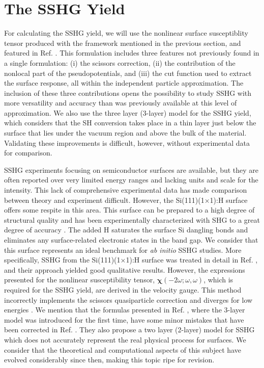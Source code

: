 
\section{The SSHG Yield}

For calculating the SSHG yield, we will use the nonlinear surface susceptiblity
tensor produced with the framework mentioned in the previous section, and
featured in Ref. \cite{andersonPRB15}. This formulation includes three features
not previously found in a single formulation: (i) the scissors correction, (ii)
the contribution of the nonlocal part of the pseudopotentials, and (iii) the cut
function used to extract the surface response, all within the independent
particle approximation. The inclusion of these three contributions opens the
possibility to study SSHG with more versatility and accuracy than was previously
available at this level of approximation. We also use the three layer (3-layer)
model for the SSHG yield, which considers that the SH conversion takes place in
a thin layer just below the surface that lies under the vacuum region and above
the bulk of the material. Validating these improvements is difficult, however,
without experimental data for comparison.

SSHG experiments focusing on semiconductor surfaces are available, but they are
often reported over very limited energy ranges and lacking units and scale for
the intensity. This lack of comprehensive experimental data has made comparison
between theory and experiment difficult. However, the Si(111)(1$\times$1):H
surface offers some respite in this area. This surface can be prepared to a high
degree of structural quality and has been experimentally characterized with SHG
to a great degree of accuracy \cite{mitchellSS01, mejiaPRB02}. The added H
saturates the surface Si dangling bonds and eliminates any surface-related
electronic states in the band gap. We consider that this surface represents an
ideal benchmark for \emph{ab initio} SSHG studies. More specifically, SSHG from
the Si(111)(1$\times$1):H surface was treated in detail in Ref.
\cite{mejiaPRB02}, and their approach yielded good qualitative results.
However, the expressions presented for the nonlinear susceptibility tensor,
$\boldsymbol{\chi}(-2\omega;\omega,\omega)$, which is required for the SSHG
yield, are derived in the velocity gauge. This method incorrectly implements the
scissors quasiparticle correction and diverges for low energies
\cite{cabellosPRB09}. We mention that the formulas presented in Ref.
\cite{mejiaPRB02}, where the 3-layer model was introduced for the first time,
have some minor mistakes that have been corrected in Ref.
\cite{andersonARXIV16}. They also propose a two layer (2-layer) model for SSHG
which does not accurately represent the real physical process for surfaces. We
consider that the theoretical and computational aspects of this subject have
evolved considerably since then, making this topic ripe for revision.

